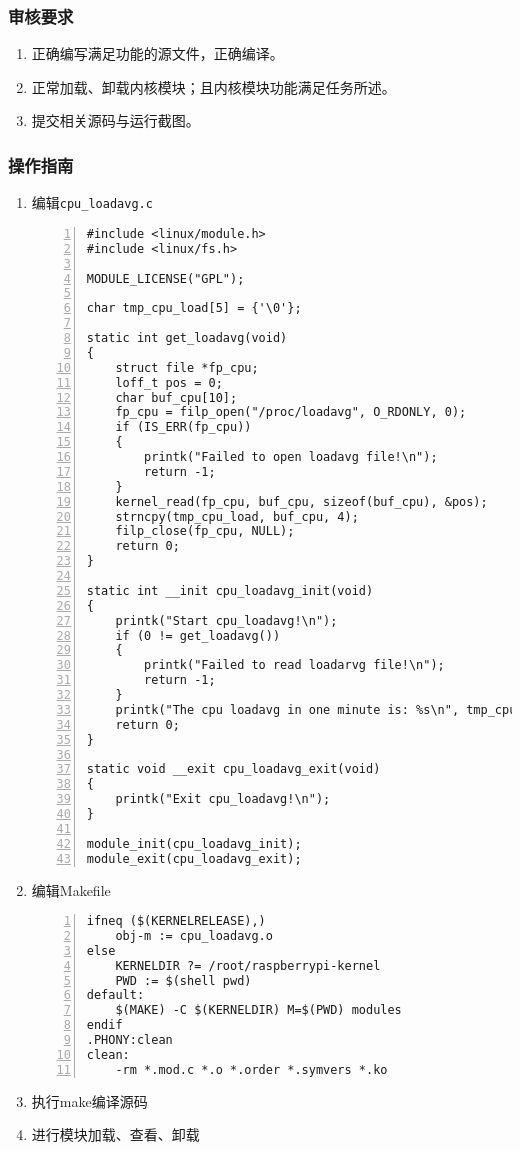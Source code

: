 \documentclass{article}
\begin{document}
\subsubsection{审核要求}
\begin{enumerate}
    \item 正确编写满足功能的源文件，正确编译。
    \item 正常加载、卸载内核模块；且内核模块功能满足任务所述。
    \item 提交相关源码与运行截图。
\end{enumerate}

\subsubsection{操作指南}
\begin{enumerate}
	\item 编辑\verb|cpu_loadavg.c|
\begin{lstlisting}[numbers=left]
#include <linux/module.h>
#include <linux/fs.h>

MODULE_LICENSE("GPL");

char tmp_cpu_load[5] = {'\0'};

static int get_loadavg(void)
{
	struct file *fp_cpu;
	loff_t pos = 0;
	char buf_cpu[10];
	fp_cpu = filp_open("/proc/loadavg", O_RDONLY, 0);
	if (IS_ERR(fp_cpu))
	{
		printk("Failed to open loadavg file!\n");
		return -1;
	}
	kernel_read(fp_cpu, buf_cpu, sizeof(buf_cpu), &pos);
	strncpy(tmp_cpu_load, buf_cpu, 4);
	filp_close(fp_cpu, NULL);
	return 0;
}

static int __init cpu_loadavg_init(void)
{
	printk("Start cpu_loadavg!\n");
	if (0 != get_loadavg())
	{
		printk("Failed to read loadarvg file!\n");
		return -1;
	}
	printk("The cpu loadavg in one minute is: %s\n", tmp_cpu_load);
	return 0;
}

static void __exit cpu_loadavg_exit(void)
{
	printk("Exit cpu_loadavg!\n");
}

module_init(cpu_loadavg_init);
module_exit(cpu_loadavg_exit);

\end{lstlisting}
    \item 编辑Makefile
\begin{lstlisting}[numbers=left]
ifneq ($(KERNELRELEASE),)
	obj-m := cpu_loadavg.o
else
	KERNELDIR ?= /root/raspberrypi-kernel
	PWD := $(shell pwd)
default:
	$(MAKE) -C $(KERNELDIR) M=$(PWD) modules
endif
.PHONY:clean
clean:
	-rm *.mod.c *.o *.order *.symvers *.ko

\end{lstlisting}
    \item 执行make编译源码
    \item 进行模块加载、查看、卸载
\end{enumerate}
\end{document}
